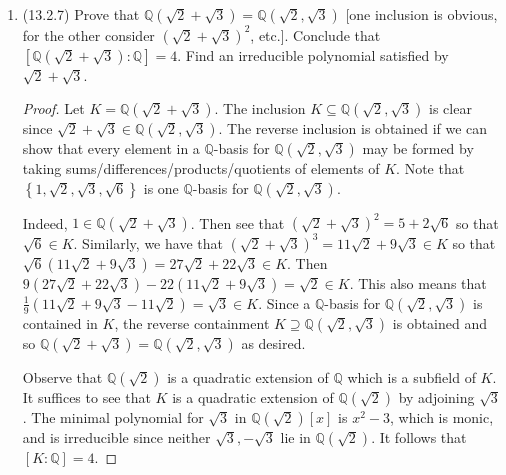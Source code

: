 \documentclass[11pt]{article}
\newcommand{\cbr}[1]{\left\{#1\right\}}
\begin{document}
\begin{enumerate}
\begin{proof}
        The minimal polynomial of $1 + \sqrt[3]{2} + \sqrt[3]{4}$ is $(x-1)^3-6x = x^3-3x^2-3x-1$. It is monic, and irreducible since any potential rational roots would be $\pm 1$, which do not satisfy the equation $x^3-3x^2-3x-1 = 0$, whereas $1 + \sqrt[3]{2} + \sqrt[3]{4}$ does. Hence the degree of $1 + \sqrt[3]{2} + \sqrt[3]{4}$ over $\mathbb{Q}$ is $3$.
    \end{proof}
    \item (13.2.7) Prove that $\mathbb{Q}(\sqrt 2 + \sqrt 3) = \mathbb{Q}(\sqrt 2, \sqrt 3)$ [one inclusion is obvious, for the other consider $(\sqrt 2 + \sqrt 3)^2$, etc.]. Conclude that $[\mathbb{Q}(\sqrt 2 + \sqrt 3)\colon \mathbb{Q}] = 4$. Find an irreducible polynomial satisfied by $\sqrt 2 + \sqrt 3$. \begin{proof}
        Let $K = \mathbb{Q}(\sqrt 2 + \sqrt 3)$. The inclusion $K \subseteq \mathbb{Q}(\sqrt 2, \sqrt 3)$ is clear since $\sqrt 2 + \sqrt 3\in \mathbb{Q}(\sqrt 2, \sqrt 3)$. The reverse inclusion is obtained if we can show that every element in a $\mathbb{Q}$-basis for $\mathbb{Q}(\sqrt 2, \sqrt 3)$ may be formed by taking sums/differences/products/quotients of elements of $K$. Note that $\cbr{1,\sqrt 2, \sqrt 3, \sqrt 6}$ is one $\mathbb{Q}$-basis for $\mathbb{Q}(\sqrt 2, \sqrt 3)$.

        Indeed, $1\in \mathbb{Q}(\sqrt 2 + \sqrt 3)$. Then see that $(\sqrt 2 + \sqrt 3)^2 = 5+2\sqrt 6$ so that $\sqrt 6\in K$. Similarly, we have that $(\sqrt 2 + \sqrt 3)^3 = 11\sqrt 2 + 9\sqrt 3\in K$ so that $\sqrt 6(11\sqrt 2 + 9\sqrt 3) = 27\sqrt 2 + 22\sqrt 3\in K$. Then $ 9(27\sqrt 2 + 22\sqrt 3) - 22(11\sqrt 2 + 9\sqrt 3) = \sqrt 2 \in K$. This also means that $\frac{1}{9}(11\sqrt 2 + 9\sqrt 3 - 11\sqrt 2) = \sqrt 3\in K$. Since a $\mathbb{Q}$-basis for $\mathbb{Q}(\sqrt 2, \sqrt 3)$ is contained in $K$, the reverse containment $K\supseteq \mathbb{Q}(\sqrt 2, \sqrt 3)$ is obtained and so $\mathbb{Q}(\sqrt 2 + \sqrt 3) = \mathbb{Q}(\sqrt 2, \sqrt 3)$ as desired.

        Observe that $\mathbb{Q}(\sqrt 2)$ is a quadratic extension of $\mathbb{Q}$ which is a subfield of $K$. It suffices to see that $K$ is a quadratic extension of $\mathbb{Q}(\sqrt 2)$ by adjoining $\sqrt 3$. The minimal polynomial for $\sqrt 3$ in $\mathbb{Q}(\sqrt 2)[x]$ is $x^2-3$, which is monic, and is irreducible since neither $\sqrt 3, -\sqrt 3$ lie in $\mathbb{Q}(\sqrt 2)$. It follows that $[K\colon \mathbb{Q}] = 4$.


\end{proof}
\end{enumerate}
\end{document}
